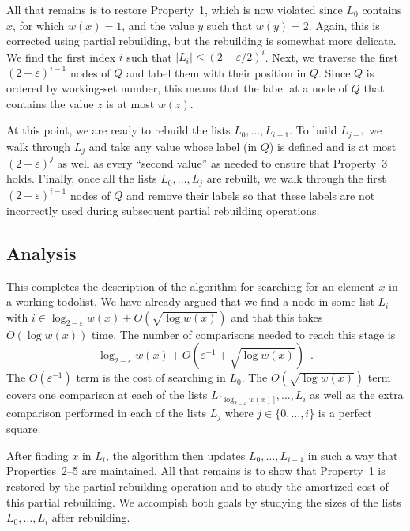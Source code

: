 \documentclass[lotsofwhite]{patmorin}
\newcommand{\eps}{\varepsilon}
\begin{document}
All that remains is to restore Property~1, which is now violated
since $L_0$ contains $x$, for which $w(x)=1$, and the value $y$ such
that $w(y)=2$.  Again, this is corrected using partial rebuilding,
but the rebuilding is somewhat more delicate.  We find the first index
$i$ such that $|L_i|\le (2-\eps/2)^i$.  Next, we traverse the first
$(2-\eps)^{i-1}$ nodes of $Q$ and label them with their position in $Q$.
Since $Q$ is ordered by working-set number, this means that the label
at a node of $Q$ that contains the value $z$ is at most $w(z)$.

At this point, we are ready to rebuild the lists $L_0,\ldots,L_{i-1}$. To
build $L_{j-1}$ we walk through $L_j$ and take any value whose label
(in $Q$) is defined and is at most $(2-\eps)^j$ as well as every
``second value'' as needed to ensure that Property~3 holds.  Finally,
once all the lists $L_0,\ldots,L_j$ are rebuilt, we walk through the first
$(2-\eps)^{i-1}$ nodes of $Q$ and remove their labels so that these labels
are not incorrectly used during subsequent partial rebuilding operations.

\subsection{Analysis}

This completes the description of the algorithm for searching for an
element $x$ in a working-todolist.  We have already argued that we find
a node in some list $L_i$ with $i\in \log_{2-\eps} w(x) + O(\sqrt{\log
w(x)})$ and that this takes $O(\log w(x))$ time.  The number of comparisons
needed to reach this stage is
\[
     \log_{2-\eps} w(x) + O\left(\eps^{-1} + \sqrt{\log w(x)}\right) \enspace .
\]
The $O(\eps^{-1})$ term is the cost of searching in $L_0$. The
$O(\sqrt{\log w(x)})$ term covers one comparison at each of the lists
$L_{\lceil\log_{2-\eps} w(x)\rceil},\ldots,L_i$ as well as the extra
comparison performed in each of the lists $L_j$ where $j\in\{0,\ldots,i\}$
is a perfect square.

After finding $x$ in $L_i$, the algorithm then updates
$L_0,\ldots,L_{i-1}$ in such a way that Properties~2--5 are maintained.
All that remains is to show that Property~1 is restored by the partial
rebuilding operation and to study the amortized cost of this partial
rebuilding.  We accompish both goals by studying the sizes of the lists
$L_0,\ldots,L_i$ after rebuilding.
\end{document}
